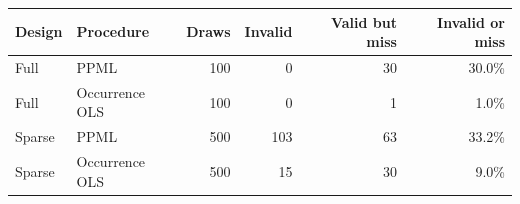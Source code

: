 \begin{tabular}{llrrrr}
\toprule
Design & Procedure & Draws & Invalid & Valid but miss & Invalid or miss \\
\midrule
Full & PPML & 100 & 0 & 30 & 30.0\% \\
Full & Occurrence OLS & 100 & 0 & 1 & 1.0\% \\
Sparse & PPML & 500 & 103 & 63 & 33.2\% \\
Sparse & Occurrence OLS & 500 & 15 & 30 & 9.0\% \\
\bottomrule
\end{tabular}
